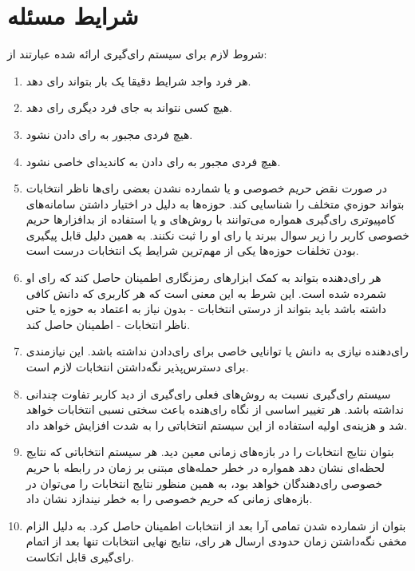 \section{شرایط مسئله}
شروط لازم برای سیستم‌ رای‌گیری ارائه شده عبارتند از:  
\begin{enumerate}
	\item 
	هر فرد واجد شرایط دقیقا یک بار بتواند رای دهد.
	\item 
	هیچ کسی نتواند به جای فرد دیگری رای دهد.
	\item 
	هیچ فردی مجبور به رای دادن نشود.
	\item 
	هیچ فردی مجبور به رای دادن به کاندیدای خاصی نشود.
	\item 
	در صورت نقض حریم خصوصی و یا شمارده نشدن بعضی رای‌ها ناظر انتخابات بتواند حوزه‌ي متخلف را شناسایی کند. حوزه‌ها به دلیل در اختیار داشتن سامانه‌های کامپیوتری رای‌گیری همواره می‌توانند با روش‌های 
	و یا استفاده از بد‌افزار‌ها حریم خصوصی کاربر را زیر سوال ببرند یا رای او را ثبت نکنند. به همین دلیل قابل پیگیری بودن تخلفات حوزه‌ها یکی از مهم‌ترین شرایط یک انتخابات درست است.
	\item 
	هر رای‌دهنده بتواند به کمک ابزارهای رمزنگاری اطمینان حاصل کند که رای او شمرده شده است. این شرط به این معنی است که هر کاربری که دانش کافی داشته باشد باید بتواند از درستی انتخابات - بدون نیاز به اعتماد به حوزه یا حتی ناظر انتخابات - اطمینان حاصل کند. 
	\item
	رای‌دهنده نیازی به دانش یا توانایی خاصی برای رای‌دادن نداشته باشد. این نیازمندی برای دسترس‌پذیر نگه‌داشتن انتخابات لازم است.
	\item
	سیستم رای‌گیری نسبت به روش‌های فعلی رای‌گیری از دید کاربر تفاوت چندانی نداشته باشد. هر تغییر اساسی از نگاه رای‌هنده باعث سختی نسبی انتخابات خواهد شد و هزینه‌ی اولیه استفاده از این سیستم انتخاباتی را به شدت افزایش خواهد داد.
	\item 
	بتوان نتایج انتخابات را در بازه‌های زمانی معین دید. هر سیستم انتخاباتی که نتایج لحظه‌ای نشان دهد همواره در خطر حمله‌های مبتنی بر زمان در رابطه با حریم خصوصی رای‌دهندگان خواهد بود، به همین منظور نتایج انتخابات را می‌توان در بازه‌های زمانی که حریم خصوصی را به خطر نیندازد نشان داد.
	\item 
	بتوان از شمارده شدن تمامی آرا بعد از انتخابات اطمینان حاصل کرد. به دلیل الزام مخفی نگه‌داشتن زمان حدودی ارسال هر رای، نتایج نهایی انتخابات تنها بعد از اتمام رای‌گیری قابل اتکاست.
\end{enumerate}

